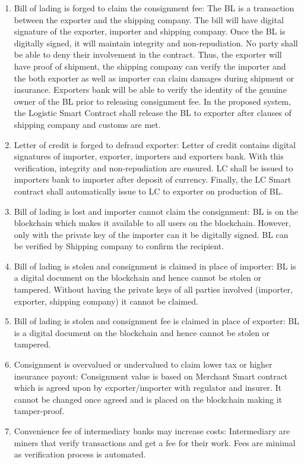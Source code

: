 \documentclass[num-refs]{wiley-article}
\begin{document}
\begin{enumerate}
    \item Bill of lading is forged to claim the consignment fee: The BL is a transaction between the exporter and the shipping company. The bill will have digital signature of the exporter, importer and shipping company. Once the BL is digitally signed, it will maintain integrity and non-repudiation. No party shall be able to deny their involvement in the contract. Thus, the exporter will have proof of shipment, the shipping company can verify the importer and the both exporter as well as importer can claim damages during shipment or insurance. Exporters bank will be able to verify the identity of the genuine owner of the BL prior to releasing consignment fee. In the proposed system, the Logistic Smart Contract shall release the BL to exporter after clauses of shipping company and customs are met.
    
    \item Letter of credit is forged to defraud exporter: Letter of credit contains digital signatures of importer, exporter, importers and exporters bank. With this verification, integrity and non-repudiation are ensured. LC shall be issued to importers bank to importer after deposit of currency. Finally, the LC Smart contract shall automatically issue to LC to exporter on production of BL.
    
    \item Bill of lading is lost and importer cannot claim the consignment: BL is on the blockchain which makes it available to all users on the blockchain. However, only with the private key of the importer can it be digitally signed. BL can be verified by Shipping company to confirm the recipient.
    
    \item Bill of lading is stolen and consignment is claimed in place of importer: BL is a digital document on the blockchain and hence cannot be stolen or tampered. Without having the private keys of all parties involved (importer, exporter, shipping company) it cannot be claimed. 
    
    \item Bill of lading is stolen and consignment fee is claimed in place of exporter: BL is a digital document on the blockchain and hence cannot be stolen or tampered.
    
    \item Consignment is overvalued or undervalued to claim lower tax or higher insurance payout: Consignment value is based on Merchant Smart contract which is agreed upon by exporter/importer with regulator and insurer. It cannot be changed once agreed and is placed on the blockchain making it tamper-proof.
    
    \item Convenience fee of intermediary banks may increase costs: Intermediary are miners that verify transactions and get a fee for their work. Fees are minimal as verification process is automated.
\end{enumerate}
\end{document}
